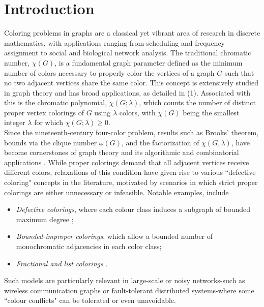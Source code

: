\documentclass[12pt]{amsart}
\theoremstyle{definition}
\theoremstyle{remark}
\numberwithin{equation}{section}
\begin{document}
\section{Introduction}
Coloring problems in graphs are a classical yet vibrant area of research in discrete mathematics, with applications ranging from scheduling and frequency assignment to social and biological network analysis. The traditional chromatic number, $\chi(G)$, is a fundamental graph parameter defined as the minimum number of colors necessary to properly color the vertices of a graph $G$ such that no two adjacent vertices share the same color. This concept is extensively studied in graph theory and has broad applications, as detailed in (1). Associated with this is the chromatic polynomial, $\chi(G;\lambda)$, which counts the number of distinct proper vertex colorings of $G$ using $\lambda$ colors, with $\chi(G)$ being the smallest integer $\lambda$ for which $\chi(G;\lambda) \geq 0$. \\

Since the nineteenth-century four-color problem, results such as Brooks' theorem, bounds via the clique number $\omega(G)$, and the factorization of $\chi(G,\lambda)$, have become cornerstones of graph theory and its algorithmic and combinatorial applications \cite{GCPZ, TRB11}. While proper colorings demand that all adjacent vertices receive different colors, relaxations of this condition have given rise to various ``defective coloring" concepts in the literature, motivated by scenarios in which strict proper colorings are either unnecessary or infeasible. Notable examples, include
\begin{itemize}
\item \emph{Defective colorings}, where each colour class induces a subgraph of bounded maximum degree \cite{CB20,HM17};%

\item \emph{Bounded-improper colorings}, which allow a bounded number of monochromatic adjacencies in each color class;

\item \emph{Fractional and list colorings} \cite{BP21}. %
\end{itemize}
Such models are particularly relevant in large-scale or noisy networks-such as wireless communication graphs or fault-tolerant distributed systems-where some ``colour conflicts" can be tolerated or even unavoidable.\\
\end{document}
